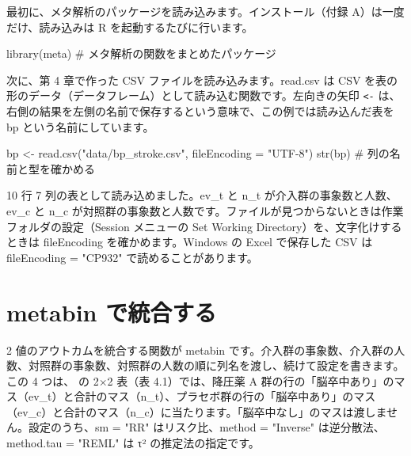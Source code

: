 最初に、メタ解析のパッケージを読み込みます。インストール（付録 A）は一度だけ、読み込みは R を起動するたびに行います。

\begin{rcode}
library(meta)      # メタ解析の関数をまとめたパッケージ
\end{rcode}

次に、第 4 章で作った CSV ファイルを読み込みます。read.csv は CSV を表の形のデータ（データフレーム）として読み込む関数です。左向きの矢印 \texttt{<-} は、右側の結果を左側の名前で保存するという意味で、この例では読み込んだ表を bp という名前にしています。

\begin{rcode}
bp <- read.csv("data/bp_stroke.csv",
               fileEncoding = "UTF-8")
str(bp)            # 列の名前と型を確かめる
\end{rcode}


10 行 7 列の表として読み込めました。ev\_t と n\_t が介入群の事象数と人数、ev\_c と n\_c が対照群の事象数と人数です。ファイルが見つからないときは作業フォルダの設定（Session メニューの Set Working Directory）を、文字化けするときは fileEncoding を確かめます。Windows の Excel で保存した CSV は fileEncoding = "CP932" で読めることがあります。

\section{metabin で統合する}
\label{sec:05-6}

2 値のアウトカムを統合する関数が metabin です。介入群の事象数、介入群の人数、対照群の事象数、対照群の人数の順に列名を渡し、続けて設定を書きます。この 4 つは、 の 2×2 表（表 4.1）では、降圧薬 A 群の行の「脳卒中あり」のマス（ev\_t）と合計のマス（n\_t）、プラセボ群の行の「脳卒中あり」のマス（ev\_c）と合計のマス（n\_c）に当たります。「脳卒中なし」のマスは渡しません。設定のうち、sm = "RR" はリスク比、method = "Inverse" は逆分散法、method.tau = "REML" は τ² の推定法の指定です。

